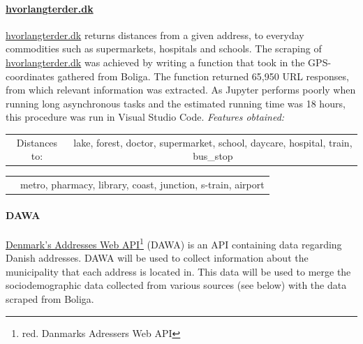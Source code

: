 \documentclass[12pt,a4paper]{article}
\begin{document}
\paragraph{\href{https://www.hvorlangterder.dk}{hvorlangterder.dk}\newline}
\href{https://www.hvorlangterder.dk}{hvorlangterder.dk} returns distances from a given address, to everyday commodities such as supermarkets, hospitals and schools.   
The scraping of \href{https://www.hvorlangterder.dk}{hvorlangterder.dk} was achieved by writing a function that took in the GPS-coordinates gathered from Boliga. The function returned 65,950 URL responses, from which relevant information was extracted.\newline
As Jupyter performs poorly when running long asynchronous tasks and the estimated running time was 18 hours, this procedure was run in Visual Studio Code.
 \vspace*{10px} \newline
\textit{Features obtained:}\newline
\begin{tabular}{c c}
Distances to: & lake, forest, doctor, supermarket,	school, daycare, hospital, train, bus\_stop \\	
\end{tabular}\newline 
\begin{tabular}{c c}
\qquad \qquad \qquad \qquad & metro, pharmacy, library, coast, junction, s-train, airport \\	
\end{tabular}

              

\paragraph{DAWA\newline}
\href{https://dawa.aws.dk/}{Denmark's Addresses Web API}\footnote{red. Danmarks Adressers Web API} (DAWA) is an API containing data regarding Danish addresses. DAWA will be used to collect information about the municipality that each address is located in. This data will be used to merge the sociodemographic data collected from various sources (see below) with the data scraped from Boliga.
\end{document}
